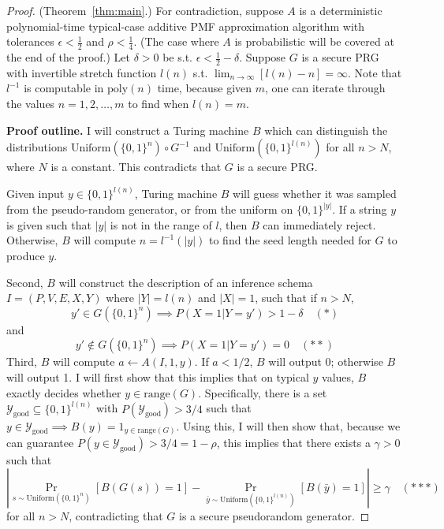 \documentclass{article}
\def \Ygood{\mathcal{Y}_\text{good}}
\def \by{{\bar{y}}}
\theoremstyle{definition}
\theoremstyle{remark}
\begin{document}
\begin{proof}{(Theorem~\ref{thm:main}.)}
For contradiction, suppose $A$ is a deterministic polynomial-time typical-case additive PMF approximation algorithm with tolerances $\epsilon < \frac{1}{2}$ and $\rho < \frac{1}{4}$.
(The case where $A$ is probabilistic will be covered at the end of the proof.)
Let $\delta > 0$ be s.t. $\epsilon < \frac{1}{2} - \delta$.
Suppose $G$ is a secure PRG with invertible stretch function $l(n)$ s.t. $\lim_{n \to \infty} [l(n) - n] = \infty$.
Note that $l^{-1}$ is computable in $\text{poly}(n)$ time, because given $m$, one can iterate through the values $n = 1, 2, \dots, m$ to find when $l(n) = m$.

\medskip
\noindent \textbf{Proof outline.}
I will construct a Turing machine $B$ which can distinguish the distributions $\text{Uniform}(\{0, 1\}^n) \circ G^{-1}$ and $\text{Uniform}(\{0, 1\}^{l(n)})$ for all $n > N$, where $N$ is a constant.  This contradicts that $G$ is a secure PRG.

Given input $y \in \{0, 1\}^{l(n)}$,
Turing machine $B$ will guess whether it was sampled from the pseudo-random generator, or from the uniform on $\{0, 1\}^{|y|}$.
If a string $y$ is given such that $|y|$ is not in the range of $l$, then $B$ can immediately reject.
Otherwise, $B$ will compute $n = l^{-1}(|y|)$ to find the seed length needed for $G$ to produce $y$.

Second, $B$ will construct the description of an inference schema $I = (P, V, E, X, Y)$ where $|Y| = l(n)$ and $|X| = 1$, such that if $n > N$,
$$
y' \in G(\{0, 1\}^n) \implies P(X = 1 | Y = y') > 1 - \delta \quad (*)
$$
and
$$
y' \notin G(\{0, 1\}^n) \implies P(X = 1 | Y = y') = 0 \quad (**)
$$
Third, $B$ will compute $a \gets A(I, 1, y)$.
If $a < 1/2$, $B$ will output 0; otherwise $B$ will output 1.
I will first show that this implies that on typical $y$ values,
$B$ exactly decides whether $y \in \text{range}(G)$.
Specifically, there is a set $\Ygood \subseteq \{0, 1\}^{l(n)}$ with $P(\Ygood) > 3/4$ such that
$y \in \Ygood \implies B(y) = 1_{y \in \text{range}(G)}$.
Using this,
I will then show that, because we can guarantee $P(y \in \Ygood) > 3/4 = 1 - \rho$,
this implies that there exists a $\gamma > 0$ such that
$$
|\Pr_{s \sim \text{Uniform}(\{0, 1\}^n)}[B(G(s)) = 1] - \Pr_{\by \sim \text{Uniform}(\{0, 1\}^{l(n)})}[B(\by) = 1]| \geq \gamma \quad (***)
$$
for all $n > N$, contradicting that $G$ is a secure pseudorandom generator.


\end{proof}
\end{document}
